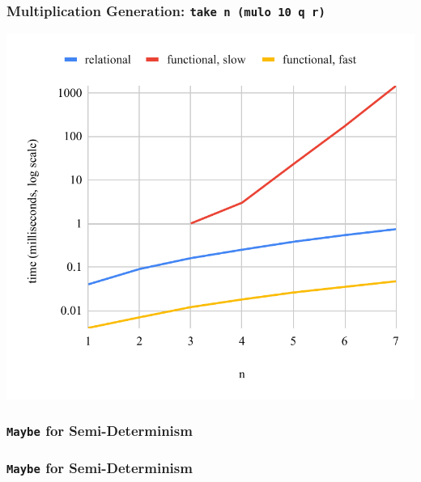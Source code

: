 \documentclass[xcolor=table, aspectratio=169]{beamer}
\begin{document}
\begin{frame}[fragile]
  \frametitle{Multiplication Generation: \lstinline[basicstyle=\Large]{take n (mulo 10 q r)}}
  \begin{center}
    \includegraphics[height=0.85\textheight]{figures/muloIOO.pdf}
  \end{center}
\end{frame}


\begin{frame}[fragile]
  \frametitle{\lstinline[basicstyle=\Large]{Maybe} for Semi-Determinism}
\begin{center}
  \begin{minipage}{0.43\textwidth}
    
  \end{minipage}
\end{center}
\end{frame}


\begin{frame}[noframenumbering]
  \frametitle{\lstinline[basicstyle=\Large]{Maybe} for Semi-Determinism}
  \begin{center}
  \begin{minipage}{0.43\textwidth}
    
  \end{minipage}
\end{center}
\end{frame}
\end{document}
